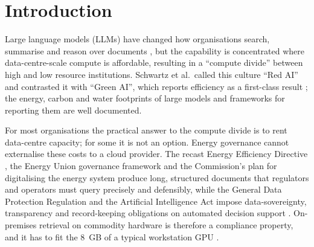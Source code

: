 \documentclass[pdflatex,sn-mathphys-num]{sn-jnl}
\theoremstyle{thmstyleone}%
\theoremstyle{thmstylethree}%
\begin{document}

\maketitle

\section{Introduction}\label{sec:intro}

Large language models (LLMs) have changed how organisations search, summarise and reason over documents \cite{bengioetal2003,zhu2025informationretrieval}, but the capability is concentrated where data-centre-scale compute is affordable, resulting in a  ``compute divide'' \cite{besiroglu2024computedividemachinelearning,sevilla2022compute,thompson2020computational,hooker2021hardware} between high and low resource institutions. Schwartz et al.\ called this culture ``Red AI'' and contrasted it with ``Green AI'', which reports efficiency as a first-class result \cite{schwartz2020green}; the energy, carbon and water footprints of large models \cite{strubell2019energycost,patterson2021carbon,Luccioni_2024,li2025makingaithirstyuncovering,devries2023growing,wu2022sustainable} and frameworks for reporting them \cite{henderson2020systematic,lacoste2019quantifyingcarbonemissionsmachine,lannelongue2021green,tabbakh2024GreenAI} are well documented.

For most organisations the practical answer to the compute divide is to rent data-centre capacity; for some it is not an option. Energy governance cannot externalise these costs to a cloud provider. The recast Energy Efficiency Directive \cite{eueed2023}, the Energy Union governance framework \cite{eugovernance2018} and the Commission's plan for digitalising the energy system \cite{eu2022digitalising} produce long, structured documents that regulators and operators must query precisely and defensibly, while the General Data Protection Regulation \cite{gdpr2016} and the Artificial Intelligence Act \cite{euaiact2024} impose data-sovereignty, transparency and record-keeping obligations on automated decision support \cite{jorgensen2025aidecisionsupport}. On-premises retrieval on commodity hardware is therefore a compliance property, and it has to fit the 8\, GB of a typical workstation GPU \cite{zhou2019edge}.
\end{document}
